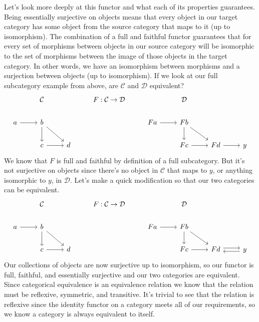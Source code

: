 \documentclass[12pt]{article}
\newcounter{examp}
\begin{document}
Let's look more deeply at this functor and what each of its properties guarantees.
Being essentially surjective on objects means that every object in our target category has some object from the source category that maps to it (up to isomorphism).
The combination of a full and faithful functor guarantees that for every set of morphisms between objects in our source category will be isomorphic to the set of morphisms between the image of those objects in the target category.
In other words, we have an isomorphism between morphisms and a surjection between objects (up to isomorphism).
If we look at our full subcategory example from above, are $\mathcal{C}$ and $\mathcal{D}$ equivalent?
\[\begin{tikzcd}
    & {\mathcal{C}} && {F:\mathcal{C}\rightarrow\mathcal{D}} && {\mathcal{D}} \\
    a & b &&& Fa & Fb \\
    & c & d &&& Fc & Fd & y
    \arrow[from=2-1, to=2-2]
    \arrow[from=2-2, to=3-2]
    \arrow[from=3-2, to=3-3]
    \arrow[from=2-2, to=3-3]
    \arrow[from=2-5, to=2-6]
    \arrow[from=2-6, to=3-7]
    \arrow[from=3-6, to=3-7]
    \arrow[from=2-6, to=3-6]
    \arrow[from=3-7, to=3-8]
  \end{tikzcd}\]
We know that $F$ is full and faithful by definition of a full subcategory.
But it's not surjective on objects since there's no object in $\mathcal{C}$ that maps to $y$, or anything isomorphic to $y$, in $\mathcal{D}$.
Let's make a quick modification so that our two categories can be equivalent.
\[\begin{tikzcd}
    & {\mathcal{C}} && {F:\mathcal{C}\rightarrow\mathcal{D}} && {\mathcal{D}} \\
    a & b &&& Fa & Fb \\
    & c & d &&& Fc & Fd & y
    \arrow[from=2-1, to=2-2]
    \arrow[from=2-2, to=3-2]
    \arrow[from=3-2, to=3-3]
    \arrow[from=2-2, to=3-3]
    \arrow[from=2-5, to=2-6]
    \arrow[from=2-6, to=3-7]
    \arrow[from=3-6, to=3-7]
    \arrow[from=2-6, to=3-6]
    \arrow[shift left, from=3-7, to=3-8]
    \arrow[shift left, from=3-8, to=3-7]
  \end{tikzcd}\]
Our collections of objects are now surjective up to isomorphism, so our functor is full, faithful, and essentially surjective and our two categories are equivalent.
Since categorical equivalence is an equivalence relation we know that the relation must be reflexive, symmetric, and transitive.
It's trivial to see that the relation is reflexive since the identity functor on a category meets all of our requirements, so we know a category is always equivalent to itself.
\end{document}
